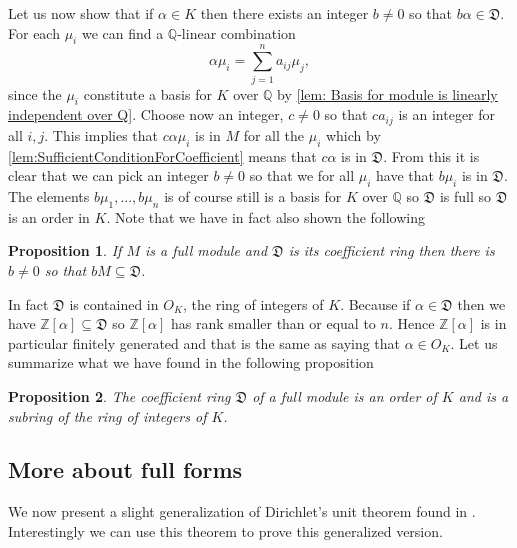 \documentclass{article}
\newtheorem{proposition}{Proposition}[section]
\newcommand{\mfrak}[1]{\mathfrak{#1}}
\newcommand{\mcal}[1]{\mathcal{#1}}
\newcommand{\mbb}[1]{\mathbb{#1}}
\numberwithin{equation}{section}
\begin{document}
Let us now show that if $\alpha \in K$ then there exists an integer $b \neq 0$ so that $b \alpha \in \mfrak D$. For each $\mu_i$ we can find a $\mbb Q$-linear combination
$$\alpha \mu_i = \sum_{j=1}^n a_{ij} \mu_j,$$
since the $\mu_i$ constitute a basis for $K$ over $\mbb Q$ by \cref{lem: Basis for module is linearly independent over Q}. Choose now an integer, $c \neq 0$ so that $c a_{ij}$ is an integer for all $i,j$. This implies that $c \alpha \mu_i$ is in $M$ for all the $\mu_i$ which by \cref{lem:SufficientConditionForCoefficient} means that $c \alpha$ is in $\mfrak D$. From this it is clear that we can pick an integer $b \neq 0$ so that we for all $\mu_i$ have that $b \mu_i$ is in $\mfrak D$. The elements $b \mu_1, ..., b\mu_n$ is of course still is a basis for $K$ over $\mbb Q$ so $\mfrak D$ is full so $\mfrak D$ is an order in $K$. Note that we have in fact also shown the following
\begin{proposition}\label{bM contained in D}
	If $M$ is a full module and $\mfrak D$ is its coefficient ring then there is $b \neq 0$ so that $bM \subseteq \mfrak D$.
\end{proposition}
In fact $\mfrak D$ is contained in $O_K$, the ring of integers of $K$. Because if $\alpha \in \mfrak D$ then we have $\mbb Z[\alpha] \subseteq \mfrak D$ so $\mbb Z[\alpha]$ has rank smaller than or equal to $n$. Hence $\mbb Z[\alpha]$ is in particular finitely generated and that is the same as saying that $\alpha \in O_K$. Let us summarize what we have found in the following proposition
\begin{proposition}\label{prop: Coefficient ring properties}
	The coefficient ring $\mfrak D$ of a full module is an order of $K$ and is a subring of the ring of integers of $K$.
\end{proposition}

\subsection{More about full forms}
We now present a slight generalization of Dirichlet's unit theorem found in \citep[Theorem 38]{marcus}. Interestingly we can use this theorem to prove this generalized version.
\end{document}
